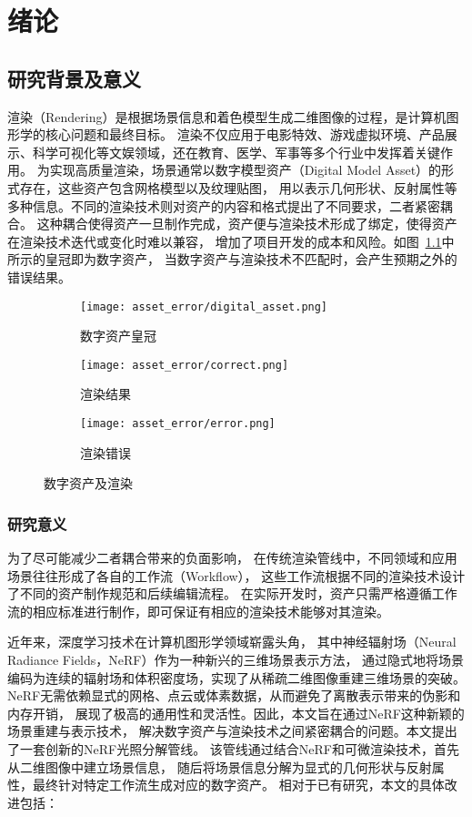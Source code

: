 
\chapter{绪论}
\section{研究背景及意义}
渲染（Rendering）是根据场景信息和着色模型生成二维图像的过程，是计算机图形学的核心问题和最终目标。
渲染不仅应用于电影特效、游戏虚拟环境、产品展示、科学可视化等文娱领域，还在教育、医学、军事等多个行业中发挥着关键作用。
为实现高质量渲染，场景通常以数字模型资产（Digital Model Asset）的形式存在，这些资产包含网格模型以及纹理贴图，
用以表示几何形状、反射属性等多种信息。不同的渲染技术则对资产的内容和格式提出了不同要求，二者紧密耦合。
这种耦合使得资产一旦制作完成，资产便与渲染技术形成了绑定，使得资产在渲染技术迭代或变化时难以兼容，
增加了项目开发的成本和风险。如图~\ref{fig:asset_rendering}中所示的皇冠即为数字资产，
当数字资产与渲染技术不匹配时，会产生预期之外的错误结果。
\begin{figure}[H]
  \centering
  \begin{subfigure}[t]{0.45\textwidth}
    \centering
    \texttt{[image: asset\_error/digital\_asset.png]}
    \caption{数字资产皇冠}
  \end{subfigure}
  \hspace{3mm}
  \begin{subfigure}[t]{0.225\textwidth}
    \centering
    \texttt{[image: asset\_error/correct.png]}
    \caption{渲染结果}
  \end{subfigure}
  \begin{subfigure}[t]{0.225\textwidth}
    \centering
    \texttt{[image: asset\_error/error.png]}
    \caption{渲染错误}
  \end{subfigure}
  \caption{数字资产及渲染}
  \label{fig:asset_rendering}
\end{figure}
\subsection{研究意义}
为了尽可能减少二者耦合带来的负面影响，
在传统渲染管线中，不同领域和应用场景往往形成了各自的工作流（Workflow），
这些工作流根据不同的渲染技术设计了不同的资产制作规范和后续编辑流程。
在实际开发时，资产只需严格遵循工作流的相应标准进行制作，即可保证有相应的渲染技术能够对其渲染。

近年来，深度学习技术在计算机图形学领域崭露头角，
其中神经辐射场（Neural Radiance Fields，NeRF）作为一种新兴的三维场景表示方法，
通过隐式地将场景编码为连续的辐射场和体积密度场，实现了从稀疏二维图像重建三维场景的突破。
NeRF无需依赖显式的网格、点云或体素数据，从而避免了离散表示带来的伪影和内存开销，
展现了极高的通用性和灵活性。因此，本文旨在通过NeRF这种新颖的场景重建与表示技术，
解决数字资产与渲染技术之间紧密耦合的问题。本文提出了一套创新的NeRF光照分解管线。
该管线通过结合NeRF和可微渲染技术，首先从二维图像中建立场景信息，
随后将场景信息分解为显式的几何形状与反射属性，最终针对特定工作流生成对应的数字资产。
相对于已有研究，本文的具体改进包括：

